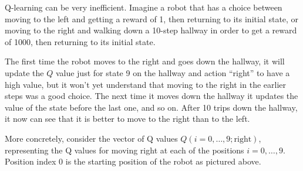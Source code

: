 Q-learning can be very inefficient. Imagine a robot that has a
choice between moving to the left and getting a reward of 1, then
returning to its initial state, or moving to the right and walking
down a 10-step hallway in order to get a reward of 1000, then
returning to its initial state.

\begin{center}
\end{center}

The first time the robot moves to the right and goes down the hallway,
it will update the $Q$ value just for state 9 on the hallway and
action ``right'' to have a high value, but it won't yet understand
that moving to the right in the earlier steps was a good choice. The
next time it moves down the hallway it updates the value of the state
before the last one, and so on.  After 10 trips down the hallway, it
now can see that it is better to move to the right than to the left.

\setcounter{MaxMatrixCols}{20}

More concretely, consider the vector of Q values $Q(i = 0, \ldots, 9;
  \text{right})$, representing the Q values for moving right at each of
the positions $i = 0, \ldots, 9$. Position index $0$ is the starting
position of the robot as pictured above.

